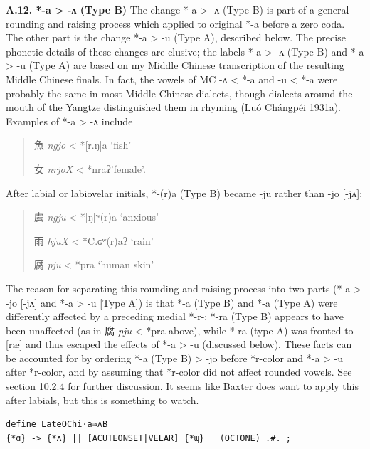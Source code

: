 \documentclass[xetex, svgnames, 12pt]{scrartcl}
\newcounter{para}
\newcommand\mypara[1]{\par\refstepcounter{para}\textbf{\thepara\space#1\space}}
\begin{document}
\mypara{A.12. *-a > -ʌ (Type B)}
 The change *-a > -ʌ (Type B) is part of a general rounding and raising process which applied to
 original *-a before a zero coda. The other part is the change *-a > -u (Type A), described below.
 The precise phonetic details of these changes are elusive; 
 the labels *-a > -ʌ (Type B) and *-a > -u (Type A)
 are based on my Middle Chinese transcription of the resulting Middle Chinese finals. In
 fact, the vowels of MC -ʌ < *-a and -u < *-a were probably the same in most Middle
 Chinese dialects, though dialects around the mouth of the Yangtze distinguished them in
 rhyming (Luó Chángpéi 1931a). Examples of *-a > -ʌ include
 \begin{quote}
 魚 %
 \textit{ngjo} < *[r.ŋ]a `fish'

 女 %
 \textit{nrjoX} < *nraʔ'female'.
\end{quote}

After labial or labiovelar initials, *-(r)a (Type B) became -ju rather than -jo [-jʌ]:

\begin{quote}
 虞 %
 \textit{ngju} < *[ŋ]ʷ(r)a `anxious'

 雨 %
 \textit{hjuX} < *C.ɢʷ(r)aʔ `rain'

 腐 %
 \textit{pju} < *pra `human skin'
 \end{quote}
 The reason for separating this rounding and raising process into two parts (*-a > -jo [-jʌ] and
 *-a > -u [Type A]) is that *-a (Type B) and *-a (Type A) were differently affected 
 by a preceding medial *-r-: *-ra (Type B)
 appears to have been unaffected (as in 腐 %
 \textit{pju} < *pra above), while *-ra (type A) 
 was fronted to [ræ]
 and thus escaped the effects of *-a > -u (discussed below). These facts can be accounted
 for by ordering *-a (Type B) > -jo before *r-color and *-a > -u after *r-color, and by assuming that
 *r-color did not affect rounded vowels. See section 10.2.4 for further discussion.
 It seems like Baxter does want to apply this after labials, but this is something to watch.
 
\begin{verbatim}
define LateOChi·a⇒ʌB 
{*ɑ} -> {*ʌ} || [ACUTEONSET|VELAR] {*ɰ} _ (OCTONE) .#. ;
\end{verbatim} 
\end{document}
